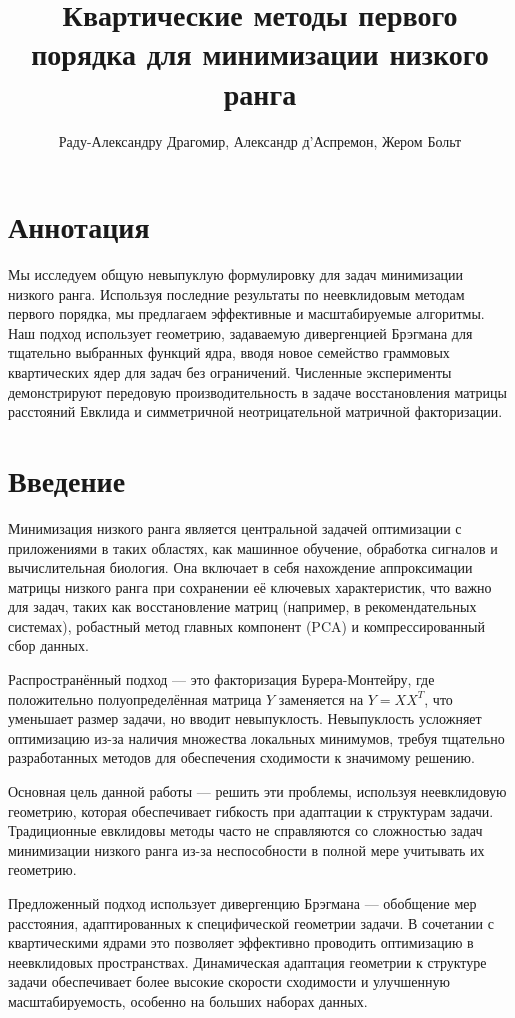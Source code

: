 \documentclass[a4paper,11pt]{article}
\title{Квартические методы первого порядка для минимизации низкого ранга}
\author{Раду-Александру Драгомир, Александр д'Аспремон, Жером Больт}
\date{}
\begin{document}
\maketitle
\tableofcontents
\newpage


\section*{Аннотация}
Мы исследуем общую невыпуклую формулировку для задач минимизации низкого ранга. Используя последние результаты по неевклидовым методам первого порядка, мы предлагаем эффективные и масштабируемые алгоритмы. Наш подход использует геометрию, задаваемую дивергенцией Брэгмана для тщательно выбранных функций ядра, вводя новое семейство граммовых квартических ядер для задач без ограничений. Численные эксперименты демонстрируют передовую производительность в задаче восстановления матрицы расстояний Евклида и симметричной неотрицательной матричной факторизации.

\section{Введение}
Минимизация низкого ранга является центральной задачей оптимизации с приложениями в таких областях, как машинное обучение, обработка сигналов и вычислительная биология. Она включает в себя нахождение аппроксимации матрицы низкого ранга при сохранении её ключевых характеристик, что важно для задач, таких как восстановление матриц (например, в рекомендательных системах), робастный метод главных компонент (PCA) и компрессированный сбор данных.

Распространённый подход — это факторизация Бурера-Монтейру, где положительно полуопределённая матрица \( Y \) заменяется на \( Y = XX^T \), что уменьшает размер задачи, но вводит невыпуклость. Невыпуклость усложняет оптимизацию из-за наличия множества локальных минимумов, требуя тщательно разработанных методов для обеспечения сходимости к значимому решению.

Основная цель данной работы — решить эти проблемы, используя неевклидовую геометрию, которая обеспечивает гибкость при адаптации к структурам задачи. Традиционные евклидовы методы часто не справляются со сложностью задач минимизации низкого ранга из-за неспособности в полной мере учитывать их геометрию.

Предложенный подход использует дивергенцию Брэгмана — обобщение мер расстояния, адаптированных к специфической геометрии задачи. В сочетании с квартическими ядрами это позволяет эффективно проводить оптимизацию в неевклидовых пространствах. Динамическая адаптация геометрии к структуре задачи обеспечивает более высокие скорости сходимости и улучшенную масштабируемость, особенно на больших наборах данных.
\end{document}

